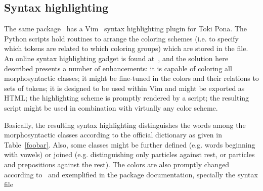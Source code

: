 

\subsection{Syntax highlighting}\label{shigh}
The same package~\cite{tokipona}
has a Vim~\cite{vim} syntax highlighting plugin
for Toki Pona.
The Python scripts hold
routines to arrange the coloring schemes
(i.e. to specify which tokens
are related to which coloring groups)
which are stored in the  file.
An online syntax highlighting gadget is found at~\cite{tpNetSH},
and the solution here described presents a number of enhancements:
it is capable of coloring all morphosyntactic classes;
it might be fine-tuned in the colors and their relations to sets of
tokens; it is designed to be used within Vim
and might be exported as HTML; the highlighting scheme is promptly
rendered by a script; the resulting script might be used in combination
with virtually any color scheme.

Basically, the resulting syntax highlighting
distinguishes the words among the morphosyntactic
classes according to the official dictionary as given in
Table~\ref{foobar}.
Also, some classes might be further defined (e.g. words beginning with
vowels) or joined (e.g. distinguishing only particles against rest,
or particles and prepositions against the rest).
The colors are also promptly changed according to~\cite{vim}
and exemplified in the package documentation,
specially the  syntax file

